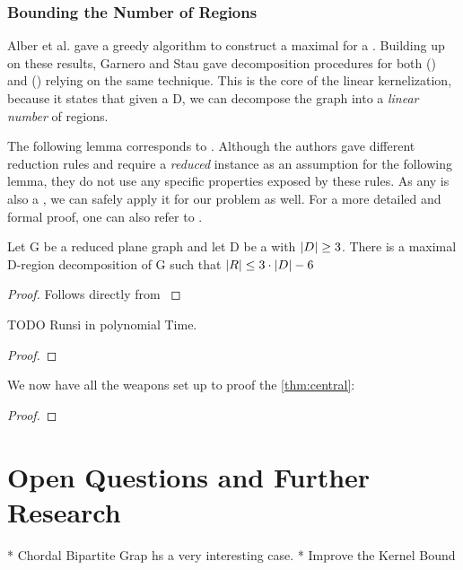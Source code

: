 \subsection{Bounding the Number of Regions}

Alber et al. \cite[Proposition 1]{Alber2004} gave a greedy algorithm to construct a maximal \dreg for a \dom. Building up on these results, Garnero and Stau gave decomposition procedures for both \rbdom (\cite{Garnero2017a}) and \tdom (\cite{Garnero2018}) relying on the same technique. This is the core of the linear kernelization, because it states that given a \dom D, we can decompose the graph into a \textit{linear number} of regions.


The following lemma corresponds to \cite[Proposition 1 and Lemma 5]{Alber2004}. Although the authors gave different reduction rules and require a \textit{reduced} instance as an assumption for the following lemma, they do not use any specific properties exposed by these rules. 
As any \sdom is also a \dom, we can safely apply it for our problem as well. For a more detailed and formal proof, one can also refer to \cite[Proposition 1]{Garnero2018}.

\begin{lemma}\label{lemma:numRegions}
    Let G be a reduced plane graph and let D be a \sdom with $\abs{D}\geq 3$. There is a maximal D-region decomposition of G such that $\abs{R} \leq 3 \cdot \abs{D} - 6$
\end{lemma}
\begin{proof} 
    Follows directly from \cite[Proposition 1 and Lemma 5]{Alber2004}
\end{proof}


\begin{lemma}
TODO Runsi in polynomial Time. 
\end{lemma}
\begin{proof} 
\end{proof}

We now have all the weapons set up to proof the \cref{thm:central}: 

\centraltheo*
\begin{proof}
\end{proof}

\chapter{Open Questions and Further Research}

* Chordal Bipartite Grap hs a very interesting case.
* Improve the Kernel Bound